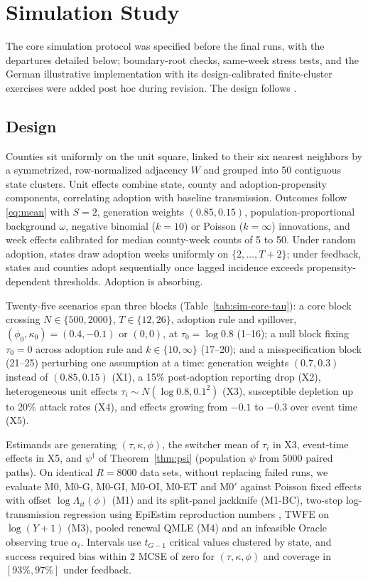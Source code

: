 \section{Simulation Study}
\label{s:simulation}

The core simulation protocol was specified before the final runs, with the departures detailed
below; boundary-root checks, same-week stress tests, and the German illustrative implementation
with its design-calibrated finite-cluster exercises were added post hoc during revision. The
design follows \citet{morris2019ademp}.

\subsection{Design}

Counties sit uniformly on the unit square, linked to their six nearest neighbors by a symmetrized,
row-normalized adjacency $W$ and grouped into 50 contiguous state clusters. Unit effects combine
state, county and adoption-propensity components, correlating adoption with baseline transmission.
Outcomes follow \eqref{eq:mean} with $S=2$, generation weights $(0.85,0.15)$, population-proportional
background $\omega$, negative binomial ($k=10$) or Poisson ($k=\infty$) innovations, and week effects
calibrated for median county-week counts of 5 to 50. Under random adoption, states draw adoption weeks
uniformly on $\{2,\dots,T+2\}$; under feedback, states and counties adopt sequentially once lagged
incidence exceeds propensity-dependent thresholds. Adoption is absorbing.

Twenty-five scenarios span three blocks (Table~\ref{tab:sim-core-tau}): a core block crossing
$N\in\{500,2000\}$, $T\in\{12,26\}$, adoption rule and spillover, $(\phi_0,\kappa_0)=(0.4,-0.1)$ or
$(0,0)$, at $\tau_0=\log0.8$ (1--16); a null block fixing $\tau_0=0$ across adoption rule and
$k\in\{10,\infty\}$ (17--20); and a misspecification block (21--25) perturbing one assumption at a
time: generation weights $(0.7,0.3)$ instead of $(0.85,0.15)$ (X1), a 15\% post-adoption reporting
drop (X2), heterogeneous unit effects $\tau_i\sim N(\log0.8,0.1^2)$ (X3), susceptible depletion up
to 20\% attack rates (X4), and effects growing from $-0.1$ to $-0.3$ over event time (X5).

Estimands are generating $(\tau,\kappa,\phi)$, the switcher mean of $\tau_i$ in X3, event-time
effects in X5, and $\psi^\dagger$ of Theorem~\ref{thm:psi} (population $\psi$ from 5000 paired paths).
On identical $R=8000$ data sets, without replacing failed runs, we evaluate
M0, M0-G, M0-GI, M0-OI, M0-ET and M0$'$ against Poisson fixed effects with offset
$\log\Lambda_{it}(\phi)$ (M1) and its split-panel jackknife (M1-BC), two-step log-transmission
regression using EpiEstim reproduction numbers \citep[M2;][]{cori2013epiestim}, TWFE on
$\log(Y+1)$ (M3), pooled renewal QMLE (M4) and an infeasible Oracle observing
true $\alpha_i$. Intervals use $t_{G-1}$ critical values clustered by state, and success required
bias within 2 MCSE of zero for $(\tau,\kappa,\phi)$ and coverage in $[93\%,97\%]$ under feedback.

